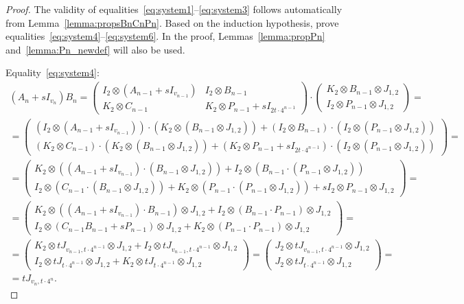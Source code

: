 \documentclass{article}
\begin{document}
\begin{proof}
The validity of equalities~\eqref{eq:system1}--\eqref{eq:system3} follows automatically from Lemma~\ref{lemma:propsBnCnPn}. Based on the induction hypothesis, prove equalities~\eqref{eq:system4}--\eqref{eq:system6}. In the proof, Lemmas~\ref{lemma:propPn} and~\ref{lemma:Pn_newdef} will also be used.

Equality~\eqref{eq:system4}:
\begin{multline}
(A_n + s I_{v_n})B_n = \left(
\begin{array}{c|c}
I_2 \otimes (A_{n-1} + sI_{v_{n-1}}) & I_2 \otimes B_{n-1} \\ \hline
K_2 \otimes C_{n-1} & K_2 \otimes P_{n-1} + sI_{2t\cdot 4^{n-1}}
\end{array}	
\right)\cdot
\left(
\begin{array}{c}
K_2 \otimes B_{n-1} \otimes J_{1, 2} \\ \hline
I_2 \otimes P_{n-1} \otimes J_{1, 2}
\end{array}
\right)=
\\
=\left(
\begin{array}{c}
(I_2 \otimes (A_{n-1} + sI_{v_{n-1}}))\cdot (K_2 \otimes (B_{n-1} \otimes J_{1, 2})) + (I_2 \otimes B_{n-1})\cdot (I_2 \otimes (P_{n-1} \otimes J_{1, 2})) \\ \hline
(K_2 \otimes C_{n-1})\cdot (K_2 \otimes (B_{n-1} \otimes J_{1, 2})) + (K_2 \otimes P_{n-1} + sI_{2t\cdot 4^{n-1}})\cdot (I_2 \otimes (P_{n-1} \otimes J_{1, 2}))
\end{array}
\right)=
\\
=\left(
\begin{array}{c}
K_2\otimes ((A_{n-1} + sI_{v_{n-1}})\cdot (B_{n-1}\otimes J_{1, 2})) + I_2\otimes (B_{n-1}\cdot (P_{n-1}\otimes J_{1, 2})) \\ \hline
I_2\otimes (C_{n-1}\cdot (B_{n-1}\otimes J_{1,2})) + K_2\otimes (P_{n-1}\cdot (P_{n-1}\otimes J_{1, 2})) + sI_2\otimes P_{n-1}\otimes J_{1, 2} 
\end{array}
\right)=
\\
=\left(
\begin{array}{c}
K_2\otimes ((A_{n-1} + sI_{v_{n-1}})\cdot B_{n-1}) \otimes J_{1, 2} + I_2 \otimes (B_{n-1}\cdot P_{n-1}) \otimes J_{1, 2}\\ \hline
I_2\otimes(C_{n-1}B_{n-1}+sP_{n-1})\otimes J_{1, 2} + K_2\otimes (P_{n-1}\cdot P_{n-1})\otimes J_{1, 2}
\end{array}
\right)=
\\
=\left(
\begin{array}{c}
K_2\otimes tJ_{v_{n-1}, t\cdot 4^{n-1}} \otimes J_{1, 2} + I_2 \otimes tJ_{v_{n-1}, t\cdot 4^{n-1}} \otimes J_{1, 2}\\ \hline
I_2\otimes tJ_{t\cdot 4^{n-1}} \otimes J_{1, 2} + K_2\otimes tJ_{t\cdot 4^{n-1}} \otimes J_{1, 2}
\end{array}
\right)=
\left(
\begin{array}{c}
J_2\otimes tJ_{v_{n-1}, t\cdot 4^{n-1}} \otimes J_{1, 2}\\ \hline
J_2\otimes tJ_{t\cdot 4^{n-1}} \otimes J_{1, 2}
\end{array}
\right) =\\= tJ_{v_n, t\cdot{4^n}}.
\end{multline}


\end{proof}
\end{document}
